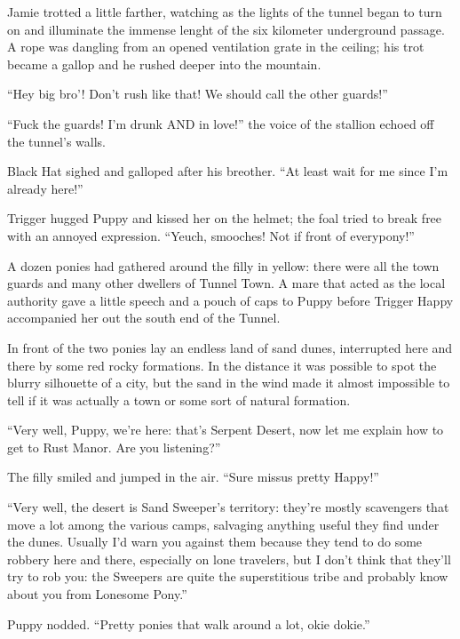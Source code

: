 Jamie trotted a little farther, watching as the lights of the tunnel began to turn on and illuminate the immense lenght of the six kilometer underground passage. A rope was dangling from an opened ventilation grate in the ceiling; his trot became a gallop and he rushed deeper into the mountain.

``Hey big bro'! Don't rush like that! We should call the other guards!''

``Fuck the guards! I'm drunk AND in love!'' the voice of the stallion echoed off the tunnel's walls.

Black Hat sighed and galloped after his breother. ``At least wait for me since I'm already here!''

\horizonline


Trigger hugged Puppy and kissed her on the helmet; the foal tried to break free with an annoyed expression. ``Yeuch, smooches! Not if front of everypony!''

A dozen ponies had gathered around the filly in yellow: there were all the town guards and many other dwellers of Tunnel Town. A mare that acted as the local authority gave a little speech and a pouch of caps to Puppy before Trigger Happy accompanied her out the south end of the Tunnel.

In front of the two ponies lay an endless land of sand dunes, interrupted here and there by some red rocky formations. In the distance it was possible to spot the blurry silhouette of a city, but the sand in the wind made it almost impossible to tell if it was actually a town or some sort of natural formation.

``Very well, Puppy, we're here: that's Serpent Desert, now let me explain how to get to Rust Manor. Are you listening?''

The filly smiled and jumped in the air. ``Sure missus pretty Happy!''

``Very well, the desert is Sand Sweeper's territory: they're mostly scavengers that move a lot among the various camps, salvaging anything useful they find under the dunes. Usually I'd warn you against them because they tend to do some robbery here and there, especially on lone travelers, but I don't think that they'll try to rob you: the Sweepers are quite the superstitious tribe and probably know about you from Lonesome Pony.''

Puppy nodded. ``Pretty ponies that walk around a lot, okie dokie.''

